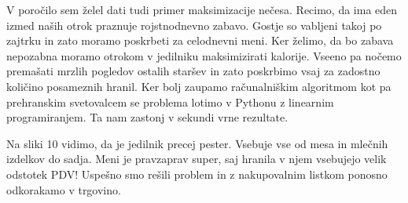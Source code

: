 \documentclass[slovene,11pt,a4paper]{article}
\begin{document}
V poročilo sem želel dati tudi primer maksimizacije nečesa. Recimo, da ima eden izmed naših  otrok praznuje rojstnodnevno zabavo. Gostje so vabljeni takoj po zajtrku in zato moramo poskrbeti za celodnevni meni. Ker želimo, da bo zabava nepozabna moramo otrokom v jedilniku maksimizirati kalorije. Vseeno pa nočemo premašati mrzlih pogledov ostalih staršev in zato poskrbimo vsaj za zadostno količino posameznih hranil. Ker bolj zaupamo računalniškim algoritmom kot pa prehranskim svetovalcem se problema lotimo v Pythonu z linearnim programiranjem. Ta nam zastonj v sekundi vrne rezultate.

Na sliki 10 vidimo, da je jedilnik precej pester. Vsebuje vse od mesa in mlečnih izdelkov do sadja. Meni je pravzaprav super, saj hranila v njem vsebujejo velik odstotek PDV! Uspešno smo rešili problem in z nakupovalnim listkom ponosno odkorakamo v trgovino.

\newpage
\end{document}
